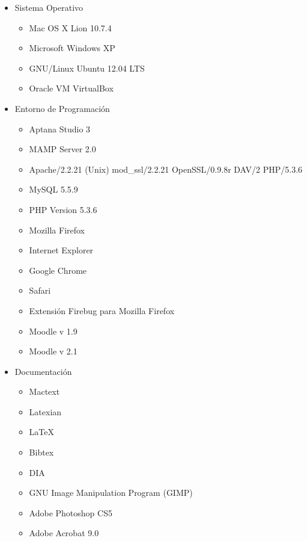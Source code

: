 \begin{itemize}
	\item Sistema Operativo
	\begin{itemize}
		\item Mac OS X Lion 10.7.4
		\item Microsoft Windows XP
		\item GNU/Linux Ubuntu 12.04 LTS
		\item Oracle VM VirtualBox 
	\end{itemize}
	
	\item Entorno de Programación
	\begin{itemize}
		\item Aptana Studio 3
		\item MAMP Server 2.0
		\item Apache/2.2.21 (Unix) mod\_ssl/2.2.21 OpenSSL/0.9.8r DAV/2 PHP/5.3.6
		\item MySQL 5.5.9
		\item PHP Version 5.3.6
		\item Mozilla Firefox
		\item Internet Explorer
		\item Google Chrome
		\item Safari
		\item Extensión Firebug para Mozilla Firefox
		\item Moodle v 1.9
		\item Moodle v 2.1
	\end{itemize}
	
	\item Documentación
	\begin{itemize}
		\item Mactext
		\item Latexian
		\item \LaTeX
		\item Bibtex
		\item DIA
		\item GNU Image Manipulation Program (GIMP)
		\item Adobe Photoshop CS5
		\item Adobe Acrobat 9.0
	\end{itemize}
\end{itemize}










































